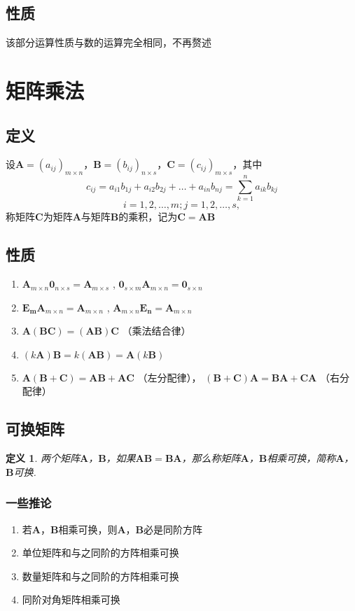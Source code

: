 \documentclass[a4paper]{ctexbook}
\newtheorem{definition}{定义}[section]
\begin{document}
\subsection{性质} 该部分运算性质与数的运算完全相同，不再赘述
\section{矩阵乘法}
\subsection{定义}
设\(\mathbf{A}=(a_{ij})_{m\times n}\)，\(\mathbf{B}=(b_{ij})_{n\times s}\)，\(\mathbf{C}=(c_{ij})_{m\times s}\)，其中
\[c_{ij}=a_{i1}b_{1j}+a_{i2}b_{2j}+\dots +a_{in}b_{nj}=\sum_{k=1}^n a_{ik}b_{kj}\]
\[i=1,2,\dots ,m;j=1,2,\dots,s,\]
称矩阵\(\mathbf{C}\)为矩阵\(\mathbf{A}\)与矩阵\(\mathbf{B}\)的乘积，记为\(\mathbf{C}=\mathbf{A}\mathbf{B}\)
\subsection{性质}
\begin{enumerate}
    \item \(\mathbf{A}_{m\times n}\mathbf{0}_{n\times s}=\mathbf{A}_{m\times s}\)  ,  \(\mathbf{0}_{s\times m}\mathbf{A}_{m\times n}=\mathbf{0}_{s\times n}\)
    \item \(\mathbf{E_m}\mathbf{A}_{m\times n}=\mathbf{A}_{m\times n}\)     ,     \(\mathbf{A}_{m\times n}\mathbf{E_n}=\mathbf{A}_{m\times n}\)
    \item \(\mathbf{A}(\mathbf{B}\mathbf{C})=(\mathbf{A}\mathbf{B})\mathbf{C}\) （乘法结合律）
    \item \((k\mathbf{A})\mathbf{B}=k(\mathbf{A}\mathbf{B})=\mathbf{A}(k\mathbf{B})\)
    \item \(\mathbf{A}(\mathbf{B}+\mathbf{C})=\mathbf{A}\mathbf{B}+\mathbf{A}\mathbf{C}\) （左分配律）， \((\mathbf{B}+\mathbf{C})\mathbf{A}=\mathbf{B}\mathbf{A}+\mathbf{C}\mathbf{A}\) （右分配律）
\end{enumerate}

\subsection{可换矩阵}
\begin{definition}
两个矩阵\(\mathbf{A}\)，\(\mathbf{B}\)，如果\(\mathbf{AB}=\mathbf{BA}\)，那么称矩阵\(\mathbf{A}\)，\(\mathbf{B}\)相乘可换，简称\(\mathbf{A}\)，\(\mathbf{B}\)可换.
\end{definition}
\subsubsection{一些推论}
\begin{enumerate}
    \item 若\(\mathbf{A}\)，\(\mathbf{B}\)相乘可换，则\(\mathbf{A}\)，\(\mathbf{B}\)必是同阶方阵
    \item 单位矩阵和与之同阶的方阵相乘可换
    \item 数量矩阵和与之同阶的方阵相乘可换
    \item 同阶对角矩阵相乘可换
\end{enumerate}
\end{document}
